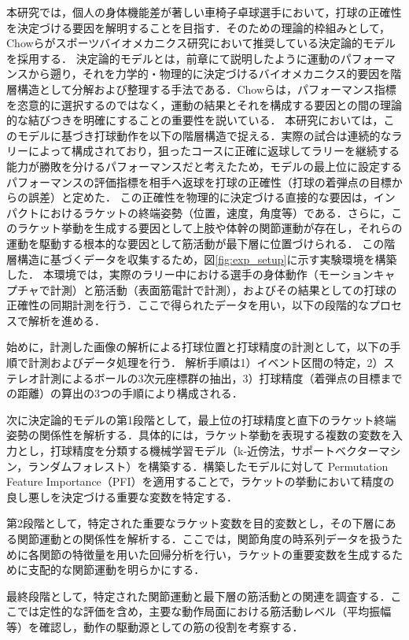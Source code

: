 \documentclass[../main]{subfiles}
\begin{document}
本研究では，個人の身体機能差が著しい車椅子卓球選手において，打球の正確性を決定づける要因を解明することを目指す．そのための理論的枠組みとして，Chowらがスポーツバイオメカニクス研究において推奨している決定論的モデルを採用する．
決定論的モデルとは，前章にて説明したように運動のパフォーマンスから遡り，それを力学的・物理的に決定づけるバイオメカニクス的要因を階層構造として分解および整理する手法である．Chowらは，パフォーマンス指標を恣意的に選択するのではなく，運動の結果とそれを構成する要因との間の理論的な結びつきを明確にすることの重要性を説いている．
本研究においては，このモデルに基づき打球動作を以下の階層構造で捉える．実際の試合は連続的なラリーによって構成されており，狙ったコースに正確に返球してラリーを継続する能力が勝敗を分けるパフォーマンスだと考えたため，モデルの最上位に設定するパフォーマンスの評価指標を相手へ返球を打球の正確性（打球の着弾点の目標からの誤差）と定めた．
この正確性を物理的に決定づける直接的な要因は，インパクトにおけるラケットの終端姿勢（位置，速度，角度等）である．さらに，このラケット挙動を生成する要因として上肢や体幹の関節運動が存在し，それらの運動を駆動する根本的な要因として筋活動が最下層に位置づけられる．
この階層構造に基づくデータを収集するため，図\ref{fig:exp_setup}に示す実験環境を構築した．
本環境では，実際のラリー中における選手の身体動作（モーションキャプチャで計測）と筋活動（表面筋電計で計測），およびその結果としての打球の正確性の同期計測を行う．ここで得られたデータを用い，以下の段階的なプロセスで解析を進める．

始めに，計測した画像の解析による打球位置と打球精度の計測として，以下の手順で計測およびデータ処理を行う．
解析手順は1）イベント区間の特定，2）ステレオ計測によるボールの3次元座標群の抽出，3）打球精度（着弾点の目標までの距離）の算出の3つの手順により構成される．


次に決定論的モデルの第1段階として，最上位の打球精度と直下のラケット終端姿勢の関係性を解析する．具体的には，ラケット挙動を表現する複数の変数を入力とし，打球精度を分類する機械学習モデル（k-近傍法，サポートベクターマシン，ランダムフォレスト）を構築する．構築したモデルに対して Permutation Feature Importance（PFI）を適用することで，ラケットの挙動において精度の良し悪しを決定づける重要な変数を特定する．

第2段階として，特定された重要なラケット変数を目的変数とし，その下層にある関節運動との関係性を解析する．ここでは，関節角度の時系列データを扱うために各関節の特徴量を用いた回帰分析を行い，ラケットの重要変数を生成するために支配的な関節運動を明らかにする．

最終段階として，特定された関節運動と最下層の筋活動との関連を調査する．ここでは定性的な評価を含め，主要な動作局面における筋活動レベル（平均振幅等）を確認し，動作の駆動源としての筋の役割を考察する．
\end{document}
